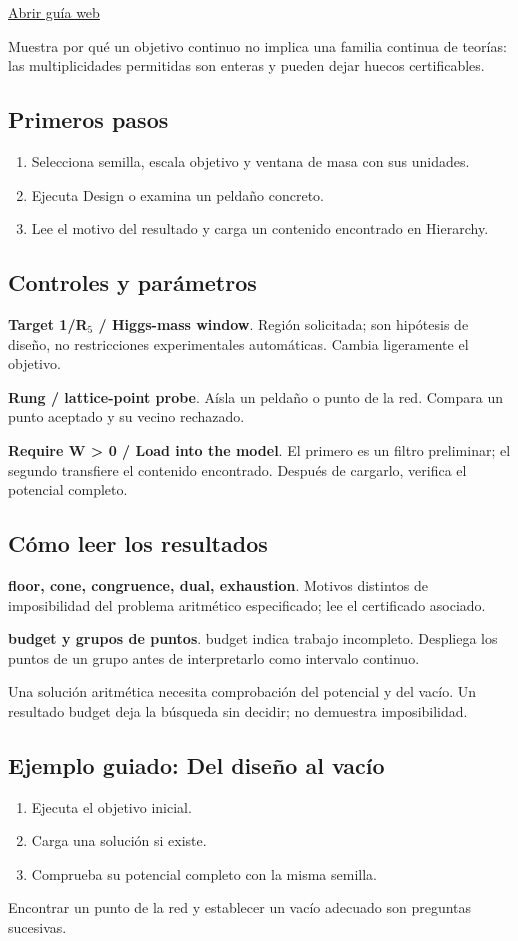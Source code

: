\documentclass[11pt,a4paper]{article}
\begin{document}
\href{https://karlesmarin.github.io/ghu-explorer/guide/es/inverse/index.html}{Abrir guía web}

Muestra por qué un objetivo continuo no implica una familia continua de teorías: las multiplicidades permitidas son enteras y pueden dejar huecos certificables.
\subsection*{Primeros pasos}
\begin{enumerate}
\item Selecciona semilla, escala objetivo y ventana de masa con sus unidades.
\item Ejecuta Design o examina un peldaño concreto.
\item Lee el motivo del resultado y carga un contenido encontrado en Hierarchy.
\end{enumerate}
\subsection*{Controles y parámetros}
\textbf{Target 1/R\ensuremath{{}_{5}} / Higgs-mass window}. Región solicitada; son hipótesis de diseño, no restricciones experimentales automáticas. Cambia ligeramente el objetivo.

\textbf{Rung / lattice-point probe}. Aísla un peldaño o punto de la red. Compara un punto aceptado y su vecino rechazado.

\textbf{Require W > 0 / Load into the model}. El primero es un filtro preliminar; el segundo transfiere el contenido encontrado. Después de cargarlo, verifica el potencial completo.

\subsection*{Cómo leer los resultados}
\textbf{floor, cone, congruence, dual, exhaustion}. Motivos distintos de imposibilidad del problema aritmético especificado; lee el certificado asociado.

\textbf{budget y grupos de puntos}. budget indica trabajo incompleto. Despliega los puntos de un grupo antes de interpretarlo como intervalo continuo.

Una solución aritmética necesita comprobación del potencial y del vacío. Un resultado budget deja la búsqueda sin decidir; no demuestra imposibilidad.
\subsection*{Ejemplo guiado: Del diseño al vacío}
\begin{enumerate}
\item Ejecuta el objetivo inicial.
\item Carga una solución si existe.
\item Comprueba su potencial completo con la misma semilla.
\end{enumerate}
Encontrar un punto de la red y establecer un vacío adecuado son preguntas sucesivas.
\end{document}
